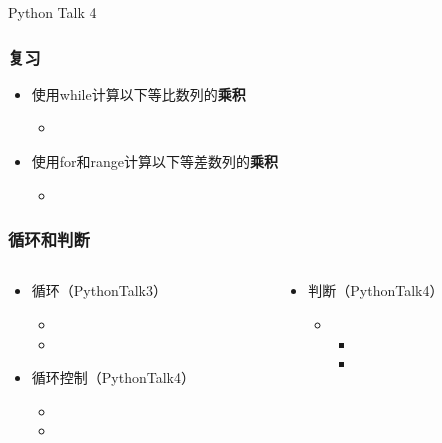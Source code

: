 


\begin{CJK}{UTF8}{gbsn}

\PreFirstFrame
\begin{frame} [fragile]
	\centerline{\fontsize{42}{42}\selectfont Python Talk 4}
\end{frame}
\PostFirstFrame

\begin{frame} [fragile]
	\frametitle{复习}
	\linespread{1.5}
	\begin{itemize}
	\item 使用while计算以下等比数列的\textbf{乘积}
		\begin{itemize}
		\item {}
		\end{itemize}
	\item 使用for和range计算以下等差数列的\textbf{乘积}
		\begin{itemize}
		\item {}
		\end{itemize}
	\end{itemize}
\end{frame}

\begin{frame} [fragile]
	\frametitle{循环和判断}
	\linespread{2}
	\begin{columns}[T]
		\begin{column}[T]{.5\textwidth}
			\begin{itemize}
			\item 循环（PythonTalk3）
				\begin{itemize}
				\item {}
				\item {}
				\end{itemize}
			\item 循环控制（PythonTalk4）
				\begin{itemize}
				\item {}
				\item {}
				\end{itemize}
			\end{itemize}
		\end{column}
		\begin{column}[T]{.5\textwidth}
			\begin{itemize}
			\item 判断（PythonTalk4）
				\begin{itemize}
				\item {}
					\begin{itemize}
					\item {}
					\item {}
					\end{itemize}
				\end{itemize}
			\end{itemize}
		\end{column}
	\end{columns}
\end{frame}


\end{CJK}
